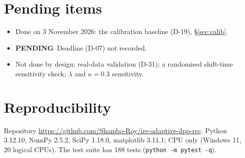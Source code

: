 \documentclass[11pt,a4paper]{article}
\newcommand{\statustag}[2]{\colorbox{#1}{\scriptsize\sffamily\bfseries #2}}
\newcommand{\pending}{\statustag{red!15}{PENDING}}
\begin{document}
\section{Pending items}\label{sec:pending}
\begin{itemize}
  \item Done on 3 November 2026: the calibration baseline (D-19), \S\ref{sec:calib}.
  \item \pending\ Deadline (D-07) not recorded.
  \item Not done by design: real-data validation (D-31); a randomised shift-time sensitivity check;
        $\lambda$ and $\kappa=0.3$ sensitivity.
\end{itemize}

\section{Reproducibility}\label{sec:repro}
Repository \url{https://github.com/Shambo-Roy/ire-adaptive-dpp-rec}. Python 3.12.10, NumPy
2.5.2, SciPy 1.18.0, matplotlib 3.11.1; CPU only (Windows 11, 20 logical CPUs). The test suite
has 188 tests (\texttt{python -m pytest -q}).
\end{document}
